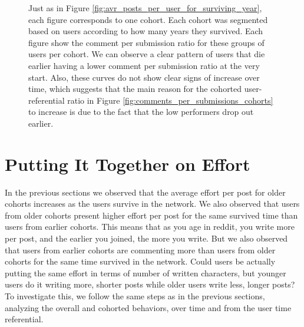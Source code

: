 \begin{figure}[!tb]
\caption{Just as in Figure \ref{fig:avr_posts_per_user_for_surviving_year}, each figure corresponds to one cohort. Each cohort was segmented based on users according to how many years they survived. Each figure show the comment per submission ratio for these groups of users per cohort. We can observe a clear pattern of users that die earlier having a lower comment per submission ratio at the very start. Also, these curves do not show clear signs of increase over time, which suggests that the main reason for the cohorted user-referential ratio in Figure \ref{fig:comments_per_submissions_cohorts} to increase is due to the fact that the low performers drop out earlier.}
\label{fig:comments_per_submissions_for_surviving_year}
\end{figure}

\section{Putting It Together on Effort}  %

In the previous sections we observed that the average effort per post for older cohorts increases as the users survive in the network. We also observed that users from older cohorts present higher effort per post for the same survived time than users from earlier cohorts. This means that as you age in reddit, you write more per post, and the earlier you joined, the more you write. But we also observed that users from earlier cohorts are commenting more than users from older cohorts for the same time survived in the network. Could users be actually putting the same effort in terms of number of written characters, but younger users do it writing more, shorter posts while older users write less, longer posts? To investigate this, we follow the same steps as in the previous sections, analyzing the overall and cohorted behaviors, over time and from the user time referential.


